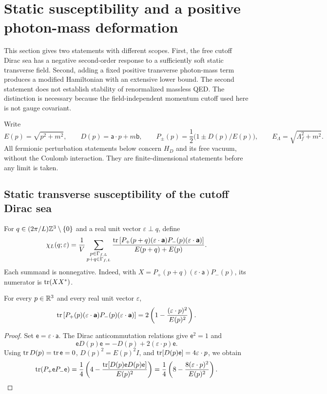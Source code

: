 \section{Static susceptibility and a positive photon-mass deformation}
\label{sec:ward}

This section gives two statements with different scopes. First, the free cutoff
Dirac sea has a negative second-order response to a sufficiently soft static
transverse field. Second, adding a fixed positive transverse photon-mass term
produces a modified Hamiltonian with an extensive lower bound. The second
statement does not establish stability of renormalized massless QED. The
distinction is necessary because the field-independent momentum cutoff used
here is not gauge covariant.

Write
\[
 E(p)=\sqrt{p^2+m^2},\qquad
 D(p)=\boldsymbol{\mathsf a}\cdot p+m\mathsf b,\qquad
 P_\pm(p)=\frac12\bigl(1\pm D(p)/E(p)\bigr),\qquad
 E_\Lambda=\sqrt{\Lambda_f^2+m^2}.
\]
All fermionic perturbation statements below concern \(H_D\) and its free
vacuum, without the Coulomb interaction. They are finite-dimensional
statements before any limit is taken.

\subsection{Static transverse susceptibility of the cutoff Dirac sea}

For \(q\in(2\pi/L)\mathbb Z^3\setminus\{0\}\) and a real unit vector
\(\varepsilon\perp q\), define
\begin{equation}
 \chi_L(q;\varepsilon)=\frac1V
 \sum_{\substack{p\in\Gamma_{f,L}\\p+q\in\Gamma_{f,L}}}
 \frac{\operatorname{tr}\left[P_+(p+q)(\varepsilon\cdot\boldsymbol{\mathsf a})
 P_-(p)(\varepsilon\cdot\boldsymbol{\mathsf a})\right]}
 {E(p+q)+E(p)}.
 \label{eq:chiL}
\end{equation}
Each summand is nonnegative. Indeed, with
\(X=P_+(p+q)(\varepsilon\cdot\boldsymbol{\mathsf a})P_-(p)\), its
numerator is \(\operatorname{tr}(XX^*)\).

\begin{lemma}
\label{lem:trace}
For every \(p\in\mathbb R^3\) and every real unit vector \(\varepsilon\),
\begin{equation}
 \operatorname{tr}\left[P_+(p)(\varepsilon\cdot\boldsymbol{\mathsf a})
 P_-(p)(\varepsilon\cdot\boldsymbol{\mathsf a})\right]
 =2\left(1-\frac{(\varepsilon\cdot p)^2}{E(p)^2}\right).
 \label{eq:trace-identity}
\end{equation}
\end{lemma}
\begin{proof}
Set \(\mathsf e=\varepsilon\cdot\boldsymbol{\mathsf a}\). The Dirac
anticommutation relations give \(\mathsf e^2=1\) and
\[
 \mathsf eD(p)\mathsf e=-D(p)+2(\varepsilon\cdot p)\mathsf e.
\]
Using \(\operatorname{tr} D(p)=\operatorname{tr}\mathsf e=0\), \(D(p)^2=E(p)^2I\), and
\(\operatorname{tr}[D(p)\mathsf e]=4\varepsilon\cdot p\), we obtain
\[
 \operatorname{tr}(P_+\mathsf eP_-\mathsf e)
 =\frac14\left(4-\frac{\operatorname{tr}[D(p)\mathsf eD(p)\mathsf e]}{E(p)^2}\right)
 =\frac14\left(8-\frac{8(\varepsilon\cdot p)^2}{E(p)^2}\right).
\]
\end{proof}

